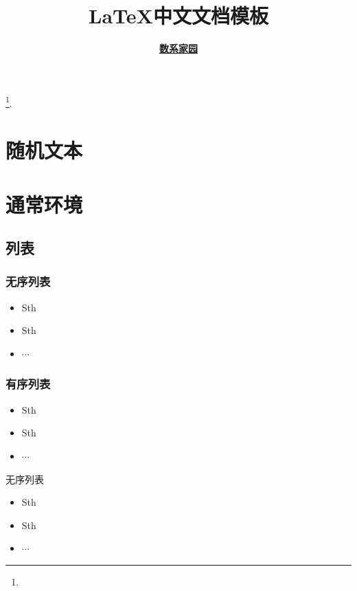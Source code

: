 \documentclass[a4paper, 12pt, UTF8]{ctexart}
\begin{document}
\title{\bf \LaTeX 中文文档模板}
\author{\bf
  \href{https://matnoble.github.io/about/}{数系家园}}
\date{}

\maketitle
\tableofcontents
\footnote{\noindent {} \newline
  \updatetext{\today}}.

\clearpage
\listoflistings

\clearpage

\section{随机文本}
\zhlipsum[2-3]

\clearpage

\section{通常环境}

\subsection{列表}

\subsubsection{无序列表}
\begin{itemize}
    \item Sth
    \item Sth
    \item $\cdots$
\end{itemize}
\subsubsection{有序列表}
\begin{itemize}
    \item[(1)] Sth
    \item[(2)] Sth
    \item[(3)] $\cdots$
\end{itemize}
\begin{mybox}{无序列表}
    \begin{itemize}[leftmargin = 10pt]
        \item Sth
        \item Sth
        \item $\cdots$
    \end{itemize}
\end{mybox}
\end{document}
